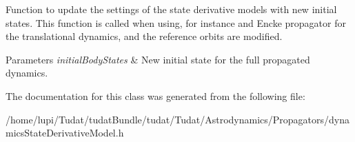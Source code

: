 Function to update the settings of the state derivative models with new initial states. This function is called when using, for instance and Encke propagator for the translational dynamics, and the reference orbits are modified. 
\begin{DoxyParams}{Parameters}
{\em initial\+Body\+States} & New initial state for the full propagated dynamics. \\
\hline
\end{DoxyParams}


The documentation for this class was generated from the following file\+:\begin{DoxyCompactItemize}
\item 
/home/lupi/\+Tudat/tudat\+Bundle/tudat/\+Tudat/\+Astrodynamics/\+Propagators/dynamics\+State\+Derivative\+Model.\+h\end{DoxyCompactItemize}
